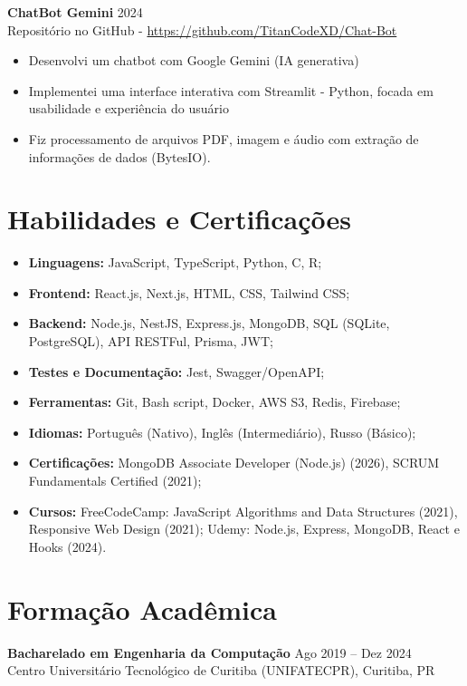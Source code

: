 \documentclass[a4paper, 10pt]{article}
\begin{document}
\medskip
\textbf{ChatBot Gemini} \hfill 2024 \\
 Repositório no GitHub - \href{https://github.com/TitanCodeXD/Chat-Bot}{https://github.com/TitanCodeXD/Chat-Bot}
\begin{itemize}
    \item Desenvolvi um chatbot com Google Gemini (IA generativa)
    \item Implementei uma interface interativa com Streamlit - Python, focada em usabilidade e experiência do usuário
    \item Fiz processamento de arquivos PDF, imagem e áudio com extração de informações de dados (BytesIO).
\end{itemize}

\section{Habilidades e Certificações}
\begin{itemize}
    \item \textbf{Linguagens:} JavaScript, TypeScript, Python, C, R;
    \item \textbf{Frontend:} React.js, Next.js, HTML, CSS, Tailwind CSS;
    \item \textbf{Backend:} Node.js, NestJS, Express.js, MongoDB, SQL (SQLite, PostgreSQL), API RESTFul, Prisma, JWT;
    \item \textbf{Testes e Documentação:} Jest, Swagger/OpenAPI;
    \item \textbf{Ferramentas:} Git, Bash script, Docker, AWS S3, Redis, Firebase;
    \item \textbf{Idiomas:} Português (Nativo), Inglês (Intermediário), Russo (Básico);
    \item \textbf{Certificações:} MongoDB Associate Developer (Node.js) (2026), SCRUM Fundamentals Certified (2021);
    \item \textbf{Cursos:} FreeCodeCamp: JavaScript Algorithms and Data Structures (2021), Responsive Web Design (2021); Udemy: Node.js, Express, MongoDB, React e Hooks (2024).
\end{itemize}


\section{Formação Acadêmica}
\textbf{Bacharelado em Engenharia da Computação} \hfill Ago 2019 -- Dez 2024 \\
Centro Universitário Tecnológico de Curitiba (UNIFATECPR), Curitiba, PR
\end{document}
